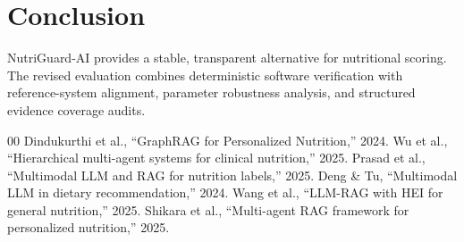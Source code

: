 \documentclass[conference]{IEEEtran}
\begin{document}
\section{Conclusion}
NutriGuard-AI provides a stable, transparent alternative for nutritional scoring. The revised evaluation combines deterministic software verification with reference-system alignment, parameter robustness analysis, and structured evidence coverage audits.

\begin{thebibliography}{00}
 Dindukurthi et al., ``GraphRAG for Personalized Nutrition,'' 2024.
 Wu et al., ``Hierarchical multi-agent systems for clinical nutrition,'' 2025.
 Prasad et al., ``Multimodal LLM and RAG for nutrition labels,'' 2025.
 Deng \& Tu, ``Multimodal LLM in dietary recommendation,'' 2024.
 Wang et al., ``LLM-RAG with HEI for general nutrition,'' 2025.
 Shikara et al., ``Multi-agent RAG framework for personalized nutrition,'' 2025.
\end{thebibliography}
\end{document}
